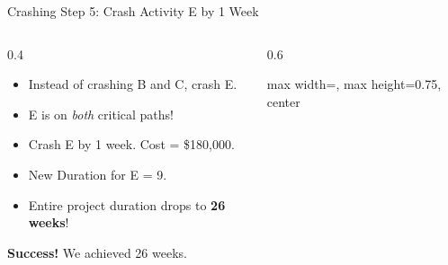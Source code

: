 \documentclass[11pt,aspectratio=169]{beamer}
\begin{document}
\begin{frame}{Crashing Step 5: Crash Activity E by 1 Week}
    \begin{columns}[T]
    \begin{column}{0.4\textwidth}
        \small
        \begin{itemize}
            \item Instead of crashing B and C, crash E.
            \item E is on \emph{both} critical paths!
            \item Crash E by 1 week. Cost = \$180,000.
            \item New Duration for E = 9.
            \item Entire project duration drops to \textbf{26 weeks}!
        \end{itemize}
        \vspace{1em}
        \textbf{Success!} We achieved 26 weeks.
    \end{column}
    \begin{column}{0.6\textwidth}
        \begin{adjustbox}{max width=\linewidth, max height=0.75\textheight, center}
\end{adjustbox}
\end{column}
\end{columns}
\end{frame}
\end{document}
